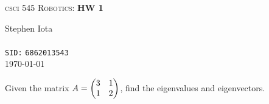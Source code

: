 \documentclass{article}
\begin{document}
    \begin{center}
        {\LARGE \textsc{csci 545 Robotics:} \textbf{HW 1}}
    \end{center}

    \bigbreak

    \begin{center}
        Stephen Iota%
        \\
        \\
        \texttt{SID:} \texttt{6862013543}
        \\
        \today
    \end{center}

    \bigbreak

    \begin{problem}
        Given the matrix $A = \begin{pmatrix} 3 & 1 \\ 1 & 2 \end{pmatrix}$, find the eigenvalues and eigenvectors.
    \end{problem}
\end{document}
